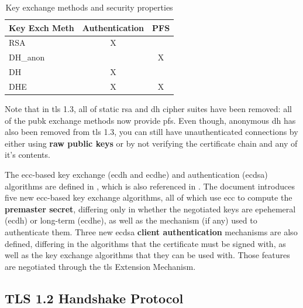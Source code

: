 \documentclass{llncs}
\begin{document}
\begin{table}[]
\centering
\caption{Key exchange methods and security properties}
\label{kemsp}
\begin{tabular}{|l|c|l|}
\hline
\textbf{Key Exch Meth} & \multicolumn{1}{l|}{Authentication} & PFS                    \\ \hline
RSA                          & X                                   &                        \\ \hline
DH\_anon                     & \multicolumn{1}{l|}{}               & \multicolumn{1}{c|}{X} \\ \hline
DH                           & X                                   &                        \\ \hline
DHE                          & X                                   & \multicolumn{1}{c|}{X} \\ \hline
\end{tabular}
\end{table}

Note that in \gls{tls} 1.3, all of static \gls{rsa} and \gls{dh} cipher suites
have been removed: all of the \gls{pubk} exchange methods now provide \gls{pfs}.
Even though, anonymous \gls{dh} has also been removed from \gls{tls} 1.3, you can
still have unauthenticated connections by either using \textbf{raw public keys} \cite{RFC7250}
or by not verifying the certificate chain and any of it's contents.

The \gls{ecc}-based key exchange (\gls{ecdh} and \gls{ecdhe}) and authentication (\gls{ecdsa})
algorithms are defined in  \cite{RFC4292}, which is also referenced
in  \cite{RFC4256}. The document introduces five new
\gls{ecc}-based key exchange algorithms, all of which use \gls{ecc} to compute
the \textbf{premaster secret}, differing only in whether the negotiated
keys are epehemeral (\gls{ecdh}) or long-term (\gls{ecdhe}), as well as the mechanism (if any) used to
authenticate them. Three new \gls{ecdsa} \textbf{client authentication} mechanisms are also defined,
differing in the algorithms that the certificate must be signed with, as well
as the key exchange algorithms that they can be used with.
Those features are negotiated through the \gls{tls} Extension Mechanism.

\subsection{TLS 1.2 Handshake Protocol}
\end{document}
